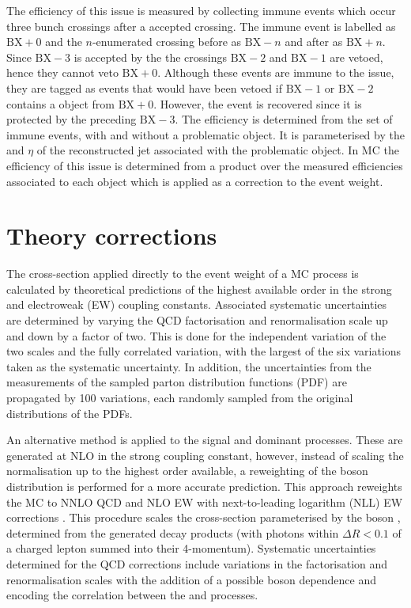 The efficiency of this issue is measured by collecting immune events which occur three bunch crossings after a \HWT accepted crossing. The immune event is labelled as $\mathrm{BX}+0$ and the $n$-enumerated crossing before as $\mathrm{BX}-n$ and after as $\mathrm{BX}+n$. Since $\mathrm{BX}-3$ is accepted by the \HWT the crossings $\mathrm{BX}-2$ and $\mathrm{BX}-1$ are vetoed, hence they cannot veto $\mathrm{BX}+0$. Although these events are immune to the issue, they are tagged as events that would have been vetoed if $\mathrm{BX}-1$ or $\mathrm{BX}-2$ contains a \HWT object from $\mathrm{BX}+0$. However, the event is recovered since it is protected by the preceding $\mathrm{BX}-3$. The efficiency is determined from the set of immune events, with and without a problematic \HWT object. It is parameterised by the \pt and $\eta$ of the reconstructed jet associated with the problematic \HWT object. In MC the efficiency of this issue is determined from a product over the measured efficiencies associated to each object which is applied as a correction to the event weight.


\section{Theory corrections}\label{sec:theory-corrections}

The cross-section applied directly to the event weight of a MC process is calculated by theoretical predictions of the highest available order in the strong and electroweak (EW) coupling constants. Associated systematic uncertainties are determined by varying the QCD factorisation and renormalisation scale up and down by a factor of two. This is done for the independent variation of the two scales and the fully correlated variation, with the largest of the six variations taken as the systematic uncertainty. In addition, the uncertainties from the measurements of the sampled \NNPDF parton distribution functions (PDF) \cite{Ball:2014uwa} are propagated by 100 variations, each randomly sampled from the original distributions of the PDFs.

An alternative method is applied to the signal and dominant \IVj processes.  These are generated at NLO in the strong coupling constant, however, instead of scaling the normalisation up to the highest order available, a reweighting of the boson \pt distribution is performed for a more accurate prediction.  This approach reweights the MC to NNLO QCD and NLO EW with next-to-leading logarithm (NLL) EW corrections \cite{Lindert:2017olm}. This procedure scales the cross-section parameterised by the boson \pt, determined from the generated decay products (with photons within ${\Delta R<0.1}$ of a charged lepton summed into their 4-momentum). Systematic uncertainties determined for the QCD corrections include variations in the factorisation and renormalisation scales with the addition of a possible boson \pt dependence and encoding the correlation between the \IZj and \IWj processes.

